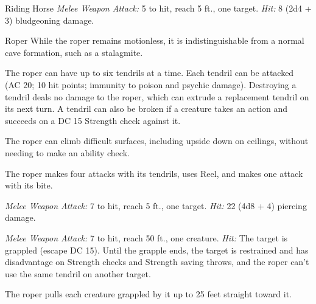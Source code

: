 \documentclass[10pt,a4paper,twoside,bg=print,twocolumn,openany,nodeprecatedcode]{dndbook}
\begin{document}
\begin{DndMonster}[float=t]{Riding Horse}
\DndMonsterBasics[
armor-class = {10},
hit-points = {\DndDice{2d10 + 2}},
speed = {60 ft.}
]
\DndMonsterAbilityScores[
 str = 16,
 dex = 10,
 con = 12,
 int = 2,
 wis = 11,
 cha = 7
]
\DndMonsterDetails[
challenge = 1/4,
]
\textsl{Melee Weapon Attack:} 5 to hit, reach 5 ft., one target. \textsl{Hit:} 8 (2d4 + 3) bludgeoning damage.

\end{DndMonster}



\begin{DndMonster}[float=t]{Roper}
\DndMonsterBasics[
armor-class = {20 (natural armor)},
hit-points = {\DndDice{11d10 + 33}},
speed = {10 ft., climb 10 ft.}
]
\DndMonsterAbilityScores[
 str = 18,
 dex = 8,
 con = 17,
 int = 7,
 wis = 16,
 cha = 6
]
\DndMonsterDetails[
skills = {Perception +6, Stealth +5},
senses = {darkvision 60 ft., passive perception 16},
challenge = 5,
]
While the roper remains motionless, it is indistinguishable from a normal cave formation, such as a stalagmite.

The roper can have up to six tendrils at a time. Each tendril can be attacked (AC 20; 10 hit points; immunity to poison and psychic damage). Destroying a tendril deals no damage to the roper, which can extrude a replacement tendril on its next turn. A tendril can also be broken if a creature takes an action and succeeds on a DC 15 Strength check against it.

The roper can climb difficult surfaces, including upside down on ceilings, without needing to make an ability check.

The roper makes four attacks with its tendrils, uses Reel, and makes one attack with its bite.

\textsl{Melee Weapon Attack:} 7 to hit, reach 5 ft., one target. \textsl{Hit:} 22 (4d8 + 4) piercing damage.

\textsl{Melee Weapon Attack:} 7 to hit, reach 50 ft., one creature. \textsl{Hit:} The target is grappled (escape DC 15). Until the grapple ends, the target is restrained and has disadvantage on Strength checks and Strength saving throws, and the roper can't use the same tendril on another target.

The roper pulls each creature grappled by it up to 25 feet straight toward it.

\end{DndMonster}
\end{document}
